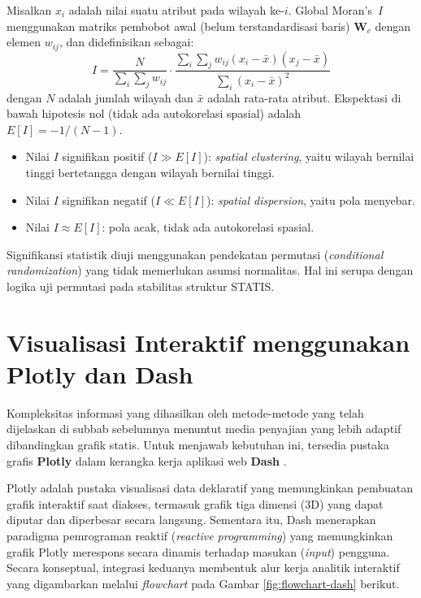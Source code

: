 \begin{definition}
  Misalkan $x_i$ adalah nilai suatu atribut pada wilayah ke-$i$. Global Moran's~$I$ menggunakan matriks pembobot awal (belum terstandardisasi baris) $\mathbf{W}_c$ dengan elemen $w_{ij}$, dan didefinisikan sebagai:
  \begin{equation}\label{eq:moran_i}
    I = \frac{N}{\displaystyle\sum_i \sum_j w_{ij}} \cdot \frac{\displaystyle\sum_i \sum_j w_{ij}(x_i - \bar{x})(x_j - \bar{x})}{\displaystyle\sum_i (x_i - \bar{x})^2}
  \end{equation}
  dengan $N$ adalah jumlah wilayah dan $\bar{x}$ adalah rata-rata atribut. Ekspektasi di bawah hipotesis nol (tidak ada autokorelasi spasial) adalah $E[I] = -1/(N-1)$.
  \begin{itemize}
    \item Nilai $I$ signifikan positif ($I \gg E[I]$): \textit{spatial clustering}, yaitu wilayah bernilai tinggi bertetangga dengan wilayah bernilai tinggi.
    \item Nilai $I$ signifikan negatif ($I \ll E[I]$): \textit{spatial dispersion}, yaitu pola menyebar.
    \item Nilai $I \approx E[I]$: pola acak, tidak ada autokorelasi spasial.
  \end{itemize}
\end{definition}

Signifikansi statistik diuji menggunakan pendekatan permutasi (\textit{conditional randomization}) yang tidak memerlukan asumsi normalitas. Hal ini serupa dengan logika uji permutasi pada stabilitas struktur STATIS.

\section{\normalsize Visualisasi Interaktif menggunakan Plotly dan Dash}

Kompleksitas informasi yang dihasilkan oleh metode-metode yang telah dijelaskan  di subbab sebelumnya menuntut media penyajian yang lebih adaptif dibandingkan grafik statis. Untuk menjawab kebutuhan ini, tersedia pustaka grafis \textbf{Plotly} \citep{plotly2015} dalam kerangka kerja aplikasi web \textbf{Dash} \citep{dash_docs}.

Plotly adalah pustaka visualisasi data deklaratif yang memungkinkan pembuatan grafik interaktif saat diakses, termasuk grafik tiga dimensi (3D) yang dapat diputar dan diperbesar secara langsung. Sementara itu, Dash menerapkan paradigma pemrograman reaktif (\textit{reactive programming}) yang memungkinkan grafik Plotly merespons secara dinamis terhadap masukan (\textit{input}) pengguna. Secara konseptual, integrasi keduanya membentuk alur kerja analitik interaktif yang digambarkan melalui \textit{flowchart} pada Gambar \ref{fig:flowchart-dash} berikut.

